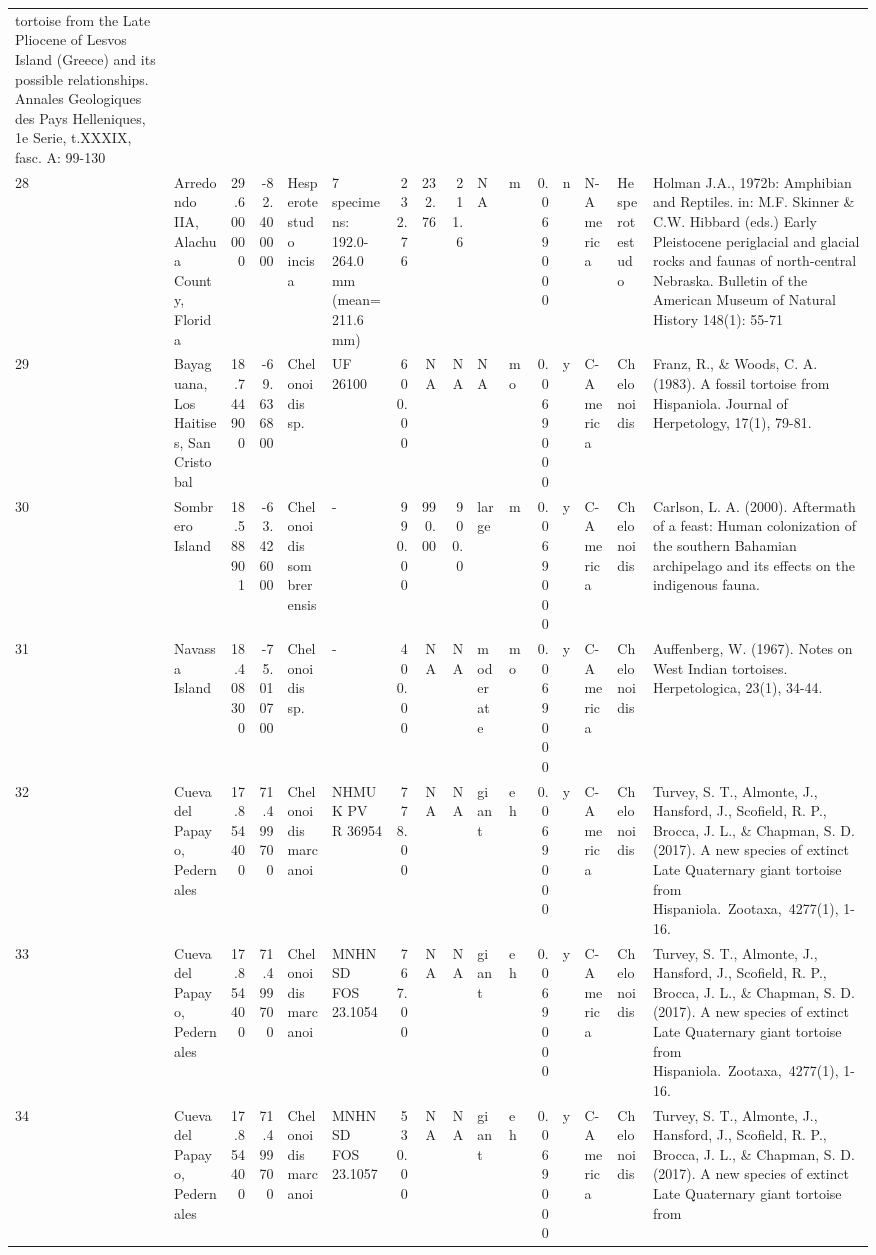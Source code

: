 \documentclass[]{article}
\begin{document}
\begin{longtable}[]{@{}llrrllrrrllrllll@{}}
tortoise from the Late Pliocene of Lesvos Island (Greece) and its
possible relationships. Annales Geologiques des Pays Helleniques, 1e
Serie, t.XXXIX, fasc. A: 99-130\tabularnewline
28 & Arredondo IIA, Alachua County, Florida & 29.600000 & -82.400000 &
Hesperotestudo incisa & 7 specimens: 192.0-264.0 mm (mean=211.6 mm) &
232.76 & 232.76 & 211.6 & NA & m & 0.069000 & n & N-America &
Hesperotestudo & Holman J.A., 1972b: Amphibian and Reptiles. in: M.F.
Skinner \& C.W. Hibbard (eds.) Early Pleistocene periglacial and glacial
rocks and faunas of north-central Nebraska. Bulletin of the American
Museum of Natural History 148(1): 55-71\tabularnewline
29 & Bayaguana, Los Haitises, San Cristobal & 18.744900 & -69.636800 &
Chelonoidis sp. & UF 26100 & 600.00 & NA & NA & NA & mo & 0.069000 & y &
C-America & Chelonoidis & Franz, R., \& Woods, C. A. (1983). A fossil
tortoise from Hispaniola. Journal of Herpetology, 17(1),
79-81.\tabularnewline
30 & Sombrero Island & 18.588901 & -63.426000 & Chelonoidis sombrerensis
& - & 990.00 & 990.00 & 900.0 & large & m & 0.069000 & y & C-America &
Chelonoidis & Carlson, L. A. (2000). Aftermath of a feast: Human
colonization of the southern Bahamian archipelago and its effects on the
indigenous fauna.\tabularnewline
31 & Navassa Island & 18.408300 & -75.010700 & Chelonoidis sp. & - &
400.00 & NA & NA & moderate & mo & 0.069000 & y & C-America &
Chelonoidis & Auffenberg, W. (1967). Notes on West Indian tortoises.
Herpetologica, 23(1), 34-44.\tabularnewline
32 & Cueva del Papayo, Pedernales & 17.854400 & 71.499700 & Chelonoidis
marcanoi & NHMUK PV R 36954 & 778.00 & NA & NA & giant & eh & 0.069000 &
y & C-America & Chelonoidis & Turvey, S. T., Almonte, J., Hansford, J.,
Scofield, R. P., Brocca, J. L., \& Chapman, S. D. (2017). A new species
of extinct Late Quaternary giant tortoise from
Hispaniola.~Zootaxa,~4277(1), 1-16.\tabularnewline
33 & Cueva del Papayo, Pedernales & 17.854400 & 71.499700 & Chelonoidis
marcanoi & MNHNSD FOS 23.1054 & 767.00 & NA & NA & giant & eh & 0.069000
& y & C-America & Chelonoidis & Turvey, S. T., Almonte, J., Hansford,
J., Scofield, R. P., Brocca, J. L., \& Chapman, S. D. (2017). A new
species of extinct Late Quaternary giant tortoise from
Hispaniola.~Zootaxa,~4277(1), 1-16.\tabularnewline
34 & Cueva del Papayo, Pedernales & 17.854400 & 71.499700 & Chelonoidis
marcanoi & MNHNSD FOS 23.1057 & 530.00 & NA & NA & giant & eh & 0.069000
& y & C-America & Chelonoidis & Turvey, S. T., Almonte, J., Hansford,
J., Scofield, R. P., Brocca, J. L., \& Chapman, S. D. (2017). A new
species of extinct Late Quaternary giant tortoise from

\end{longtable}
\end{document}
